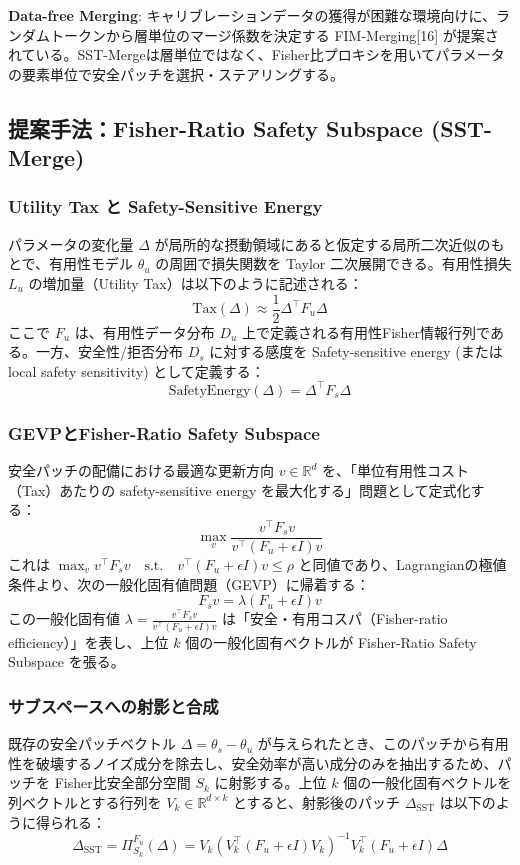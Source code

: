 \textbf{Data-free Merging}: キャリブレーションデータの獲得が困難な環境向けに、ランダムトークンから層単位のマージ係数を決定する FIM-Merging[16] が提案されている。SST-Mergeは層単位ではなく、Fisher比プロキシを用いてパラメータの要素単位で安全パッチを選択・ステアリングする。

\subsection{提案手法：Fisher-Ratio Safety Subspace (SST-Merge)}

\subsubsection{Utility Tax と Safety-Sensitive Energy}
パラメータの変化量 $\Delta$ が局所的な摂動領域にあると仮定する局所二次近似のもとで、有用性モデル $\theta_u$ の周囲で損失関数を Taylor 二次展開できる。有用性損失 $L_u$ の増加量（Utility Tax）は以下のように記述される：
\[ \text{Tax}(\Delta) \approx \frac{1}{2} \Delta^\top F_u \Delta \]
ここで $F_u$ は、有用性データ分布 $D_u$ 上で定義される有用性Fisher情報行列である。一方、安全性/拒否分布 $D_s$ に対する感度を Safety-sensitive energy (または local safety sensitivity) として定義する：
\[ \text{SafetyEnergy}(\Delta) = \Delta^\top F_s \Delta \]

\subsubsection{GEVPとFisher-Ratio Safety Subspace}
安全パッチの配備における最適な更新方向 $v \in \mathbb{R}^d$ を、「単位有用性コスト（Tax）あたりの safety-sensitive energy を最大化する」問題として定式化する：
\[ \max_v \frac{v^\top F_s v}{v^\top (F_u + \epsilon I) v} \]
これは $\max_v v^\top F_s v \quad \text{s.t.} \quad v^\top (F_u + \epsilon I) v \le \rho$ と同値であり、Lagrangianの極値条件より、次の一般化固有値問題（GEVP）に帰着する：
\[ F_s v = \lambda (F_u + \epsilon I) v \]
この一般化固有値 $\lambda = \frac{v^\top F_s v}{v^\top (F_u + \epsilon I) v}$ は「安全・有用コスパ（Fisher-ratio efficiency）」を表し、上位 $k$ 個の一般化固有ベクトルが Fisher-Ratio Safety Subspace を張る。

\subsubsection{サブスペースへの射影と合成}
既存の安全パッチベクトル $\Delta = \theta_s - \theta_u$ が与えられたとき、このパッチから有用性を破壊するノイズ成分を除去し、安全効率が高い成分のみを抽出するため、パッチを Fisher比安全部分空間 $S_k$ に射影する。上位 $k$ 個の一般化固有ベクトルを列ベクトルとする行列を $V_k \in \mathbb{R}^{d \times k}$ とすると、射影後のパッチ $\Delta_{\text{SST}}$ は以下のように得られる：
\[ \Delta_{\text{SST}} = \Pi_{S_k}^{F_u} (\Delta) = V_k (V_k^\top (F_u + \epsilon I) V_k)^{-1} V_k^\top (F_u + \epsilon I) \Delta \]

